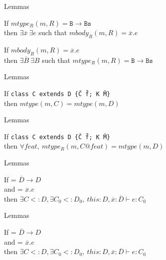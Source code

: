 \documentclass{beamer}
\newcommand{\cdecl}[6]{\texttt{class #1 extends #2 \{\={#3} \={#4}; #5 \={#6}\}}}
\begin{document}
    \begin{frame}{Lemmas}
        \begin{lemma}
            If $mtype_R(m, R) = \mathtt{B} \rightarrow \mathtt{Bs}$ \\
            then $\exists \overline{x}~\exists e$ such that
                        $mbody_R(m, R) = \overline{x}. e$
        \end{lemma}
        \begin{lemma}
            If $mbody_R(m, R) = \overline{x} . e $ \\
            then $\exists \overline{B}~\exists B$ such that
                        $mtype_R(m, R) = \mathtt{B} \rightarrow \mathtt{Bs}$
        \end{lemma}
    \end{frame}

    \begin{frame}{Lemmas}
        \begin{lemma}
            If \cdecl{C}{D}{C}{f}{K}{M} \\
            then $mtype(m, C) = mtype(m, D)$        
        \end{lemma}
    \end{frame}


    \begin{frame}{Lemmas}
        \begin{lemma}
            If \cdecl{C}{D}{C}{f}{K}{M} \\
            then $\forall feat,~mtype_R(m, C@feat) = mtype(m, D)$        
        \end{lemma}
    \end{frame}

    \begin{frame}{Lemmas}
        \begin{lemma}
            If  = $\overline{D} \rightarrow D$ \\
            and  = $\overline{x}.e$\\
            then $\exists C <: D, \exists C_0 <: D_0,~this: D, \overline{x}: \overline{D}\vdash e: C_0$
        \end{lemma}
    \end{frame}



    \begin{frame}{Lemmas}
        \begin{lemma}
            If  = $\overline{D} \rightarrow D$ \\
            and  = $\overline{x}.e$\\
            then $\exists C <: D, \exists C_0 <: D_0,~this: D, \overline{x}: \overline{D}\vdash e: C_0$
        \end{lemma}
    \end{frame}
\end{document}
